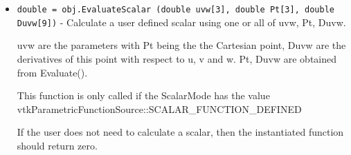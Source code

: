 \begin{itemize}
\item  \verb|double = obj.EvaluateScalar (double uvw[3], double Pt[3], double Duvw[9])| -  Calculate a user defined scalar using one or all of uvw, Pt, Duvw.

 uvw are the parameters with Pt being the the Cartesian point, 
 Duvw are the derivatives of this point with respect to u, v and w.
 Pt, Duvw are obtained from Evaluate().

 This function is only called if the ScalarMode has the value
 vtkParametricFunctionSource::SCALAR\_FUNCTION\_DEFINED

 If the user does not need to calculate a scalar, then the 
 instantiated function should return zero. 


\end{itemize}
